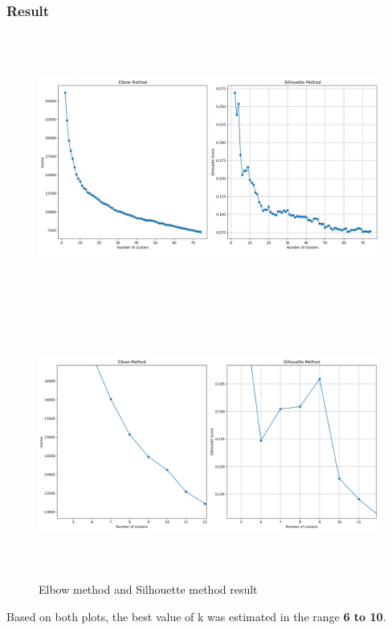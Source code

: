 \documentclass[12pt,a4paper]{report}
\begin{document}
\subsubsection{Result}
\begin{figure}[H]
    \centering
    \includegraphics[width=6.5in,height=3.4166666666666665in]{media/image3.png}
\end{figure}

\begin{figure}[H]
    \centering
    \includegraphics[width=6.5in,height=3.4444444444444446in]{media/image12.png}
    \caption{Elbow method and Silhouette method result}
\end{figure}

Based on both plots, the best value of k was estimated in the range \textbf{6 to 10}.
\end{document}
